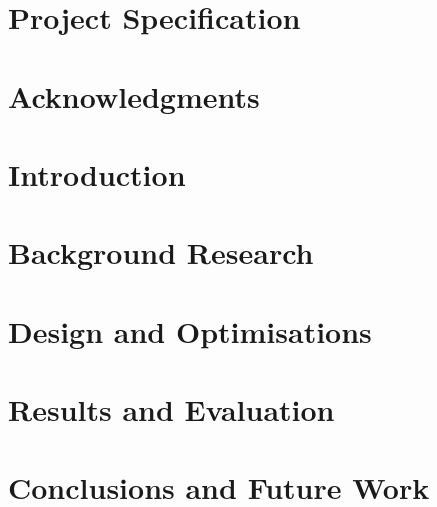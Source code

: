 \documentclass[]{UCD_CS_FYP_Report}
\begin{document}
\maketitle


\chapter*{Project Specification}



\begin{abstract}
	
\end{abstract}
\newpage


\chapter*{Acknowledgments}



\tableofcontents{}\newpage
\newpage


\chapter{Introduction}



\chapter{Background Research}


\chapter{Design and Optimisations}


\chapter{Results and Evaluation}


\chapter{Conclusions and Future Work}


\newpage


\label{endpage}

\appendix
\chapter{}

\end{document}
